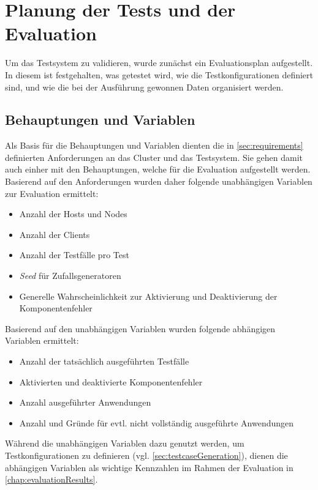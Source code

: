 \section{Planung der Tests und der Evaluation}
\label{sec:evaluationPlan}

Um das Testsystem zu validieren, wurde zunächst ein Evaluationsplan aufgestellt.
In diesem ist festgehalten, was getestet wird, wie die Testkonfigurationen definiert sind, und wie die bei der Ausführung gewonnen Daten organisiert werden.

\subsection{Behauptungen und Variablen}
\label{sec:theses}

Als Basis für die Behauptungen und Variablen dienten die in \autoref{sec:requirements} definierten Anforderungen an das Cluster und das Testsystem.
Sie gehen damit auch einher mit den Behauptungen, welche für die Evaluation aufgestellt werden.
Basierend auf den Anforderungen wurden daher folgende unabhängigen Variablen zur Evaluation ermittelt:

\begin{itemize}
    \item Anzahl der Hosts und Nodes
    \item Anzahl der Clients
    \item Anzahl der Testfälle pro Test
    \item \emph{Seed} für Zufallsgeneratoren
    \item Generelle Wahrscheinlichkeit zur Aktivierung und Deaktivierung der Komponentenfehler
\end{itemize}

Basierend auf den unabhängigen Variablen wurden \uA folgende abhängigen Variablen ermittelt:

\begin{itemize}
    \item Anzahl der tatsächlich ausgeführten Testfälle
    \item Aktivierten und deaktivierte Komponentenfehler
    \item Anzahl ausgeführter Anwendungen
    \item Anzahl und Gründe für evtl. nicht vollständig ausgeführte Anwendungen
\end{itemize}

Während die unabhängigen Variablen dazu genutzt werden, um Testkonfigurationen zu definieren (vgl. \autoref{sec:testcaseGeneration}), dienen die abhängigen Variablen als wichtige Kennzahlen im Rahmen der Evaluation in \autoref{chap:evaluationResults}.

